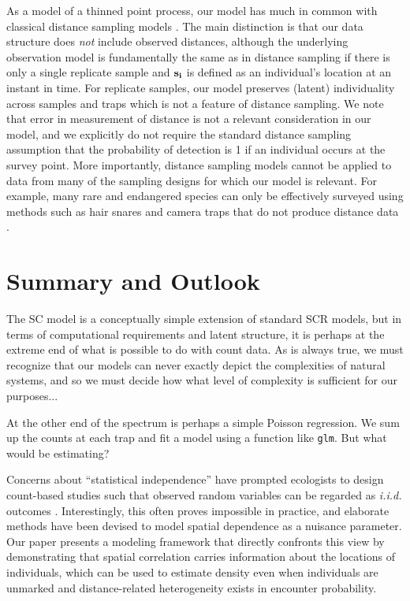 As a model of a thinned point process, our model has much in common
with classical distance sampling models \citep{buckland_etal:2001}.
The main distinction is that our data structure does {\it not} include
observed distances, although the underlying observation model is
fundamentally the same as in distance sampling if there is only a
single replicate sample and $\bf{s}_i$ is defined as an individual's
location at an instant in time. For replicate samples, our model preserves
(latent) individuality across samples and traps which is not a feature
of distance sampling. We note that error in measurement of distance is
not a relevant consideration in our model, and we explicitly do not
require the standard distance sampling assumption that the probability
of detection is 1 if an individual occurs at the survey point. More
importantly, distance sampling models cannot be applied to data from
many of the sampling designs for which our model is relevant. For
example, many rare and endangered species can only be
effectively surveyed using methods such as hair snares and camera
traps that do not produce distance data \citep{oconnell_etal:2010}.


\section{Summary and Outlook}

The SC model is a conceptually simple extension of standard SCR
models, but in terms of computational requirements and latent
structure, it is perhaps at the extreme end of what is possible to do
with count data. As is always true, we must recognize that
our models can never exactly depict the complexities of natural
systems, and so we must decide how what level of complexity is
sufficient for our purposes...

At the other end of the spectrum is perhaps a simple Poisson
regression. We sum up the counts at each trap and fit a model using a
function like \verb+glm+. But what would be estimating?

Concerns about ``statistical independence'' have prompted
ecologists to design count-based studies such that observed
random variables can be regarded as {\it i.i.d.} outcomes
\citep{hurlbert:1984}. Interestingly, this
often proves impossible in practice, and elaborate
methods have been devised to model spatial dependence as a nuisance
parameter. Our paper presents a modeling framework that directly
confronts this view by demonstrating that spatial
correlation carries information about the locations of individuals,
which can be used to estimate density even when individuals
are unmarked and distance-related heterogeneity exists in encounter
probability.




